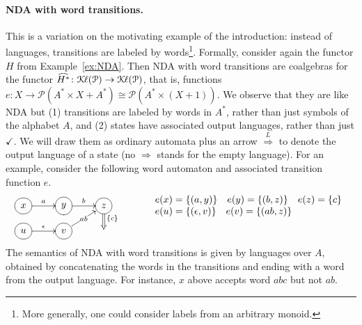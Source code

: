 \documentclass[oribibl,envcountsame,envcountsect,runningheads]{llncs}
\newcommand{\Pow}{\mathcal{P}}
\newcommand{\Kl}{\mathcal{K}{\kern-.2ex}\ell}
\newcommand{\lift}[1]{\smash{\widehat{#1}}}
\newcommand{\free}[1]{{#1^*}}
\newcommand{\state}[1]{*++[F-:<10pt>]{#1}}
\renewcommand{\>}{\rangle}
\def\To{\Rightarrow}
\begin{document}
\paragraph{NDA with word transitions.} This is a variation on the motivating example of the introduction: instead of languages, transitions are labeled by words\footnote{More generally, one could consider labels from an arbitrary monoid.}. Formally, consider again the functor $H$ from Example~\ref{ex:NDA}. Then NDA with word transitions are coalgebras for the functor $\lift{\free{H}} \colon \Kl(\Pow) \to \Kl(\Pow)$, that is, functions $e \colon X \to \Pow(A^{*} \times X + A^{*})\cong \Pow(A^{*}\times (X+1))$. We observe that they are like NDA  but (1) transitions are labeled by words in $A^{*}$, rather than just symbols of the alphabet $A$, and (2) states have associated output languages, rather than just $\checkmark$. We will draw them as ordinary automata plus an arrow $\stackrel{L}{\To}$ to denote the output language of a state (no $\To$ stands for the empty language). For an example, consider the following word automaton and associated transition function $e$.
$$\begin{array}{cll}
\xymatrix@R=.3cm{
    \state{x} \ar[r]^{a}  & \state{y} \ar[r]^{b} & \state{z} \ar@{=>}[d]^{\{c\}} \\
    \state{u} \ar[r]^{\epsilon}  & \state{v} \ar[ru]|{ab} &  \\}
  &\qquad
\begin{array}{l}
 e(x) = \{(a,y)\} \quad
 e(y) = \{(b,z)\} \quad
 e(z) = \{c\}\\
 e(u) = \{(\epsilon,v)\}\quad
  e(v) = \{(ab,z)\}
 \end{array}
\end{array}
$$
The semantics of NDA with word transitions is given by languages over $A$, obtained by concatenating the words in the transitions and ending with a word from the output language. For instance, $x$ above accepts word $abc$ but not $ab$.
\end{document}
